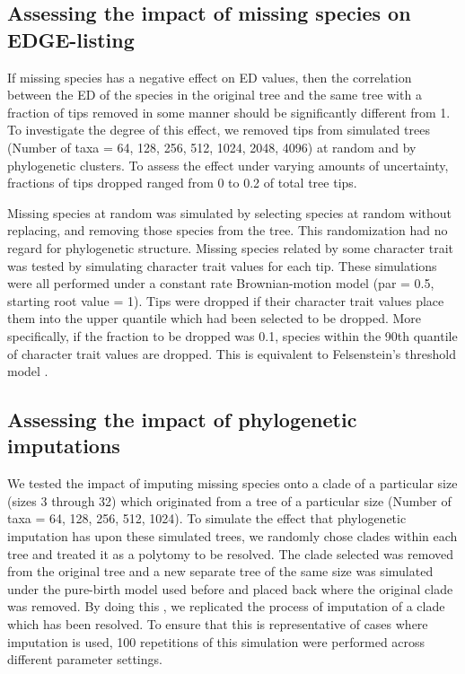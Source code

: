 \documentclass[12pt,english]{article}
\begin{document}
\subsection*{Assessing the impact of missing species on EDGE-listing}
If missing species has a negative effect on ED values, then the
correlation between the ED of the species in the original tree and the
same tree with a fraction of tips removed in some manner should be
significantly different from 1. To investigate the degree of this
effect, we removed tips from simulated trees (Number of taxa = 64,
128, 256, 512, 1024, 2048, 4096) at random and by phylogenetic
clusters. To assess the effect under varying amounts of uncertainty,
fractions of tips dropped ranged from 0 to 0.2 of total tree tips.

Missing species at random was simulated by selecting species at random
without replacing, and removing those species from the tree. This
randomization had no regard for phylogenetic structure. Missing
species related by some character trait was tested by simulating
character trait values for each tip. These simulations were all
performed under a constant rate Brownian-motion model (par = 0.5,
starting root value = 1). Tips were dropped if their character trait
values place them into the upper quantile which had been selected to
be dropped. More specifically, if the fraction to be dropped was 0.1,
species within the 90th quantile of character trait values are
dropped. This is equivalent to Felsenstein’s threshold model
\autocite{Felsenstein2004}.

\subsection*{Assessing the impact of phylogenetic imputations}
We tested the impact of imputing missing species onto a clade of a
particular size (sizes 3 through 32) which originated
from a tree of a particular size (Number of taxa = 64, 128, 256, 512,
1024). To simulate the effect that phylogenetic imputation has upon
these simulated trees, we randomly chose clades within each tree and
treated it as a polytomy to be resolved. The clade selected was
removed from the original tree and a new separate tree of the same
size was simulated under the pure-birth model used before and placed
back where the original clade was removed. By doing this , we
replicated the process of imputation of a clade which has been
resolved. To ensure that this is representative of cases where
imputation is used, 100 repetitions of this simulation were performed
across different parameter settings.
\end{document}
